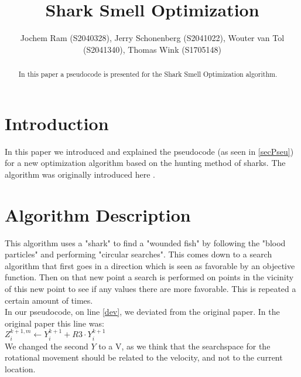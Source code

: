 \documentclass[runningheads]{llncs}
\begin{document}
%
\title{Shark Smell Optimization}
%
%
\author{Jochem Ram (S2040328), Jerry Schonenberg (S2041022), Wouter van Tol (S2041340), Thomas Wink (S1705148)}
%
%
%
\maketitle              %
%
\begin{abstract}
In this paper a pseudocode is presented for the Shark Smell Optimization algorithm.
\end{abstract}





\section{Introduction}
In this paper we introduced and explained the pseudocode (as seen in \ref{secPseu}) for a new optimization algorithm based on the hunting method of sharks. The algorithm was originally introduced here \cite{abedinia2014shark}.

\section{Algorithm Description} \label{sec:description}
This algorithm uses a "shark" to find a "wounded fish" by following the "blood particles" and performing "circular searches". This comes down to a search algorithm that first goes in a direction which is seen as favorable by an objective function. Then on that new point a search is performed on points in the vicinity of this new point to see if any values there are more favorable. This is repeated a certain amount of times. \\
In our pseudocode, on line \ref{dev}, we deviated from the original paper. In the original paper this line was: \\
$Z_i^{k+1, m} \leftarrow Y_i^{k+1} + R3 \cdot Y_i^{k+1}$ \\
We changed the second $ Y $ to a V, as we think that the searchspace for the rotational movement should be related to the velocity, and not to the current location.
\end{document}
